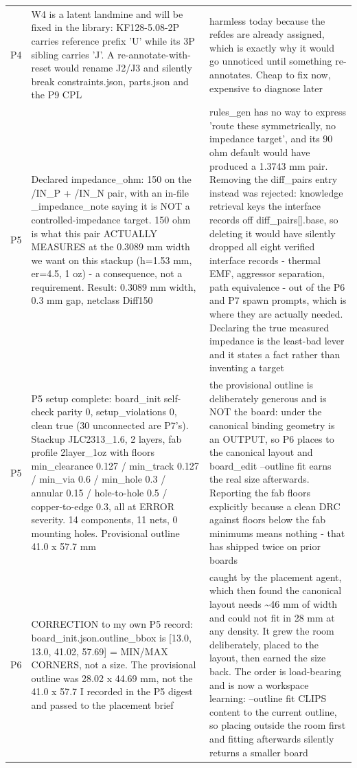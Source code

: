 \documentclass[11pt,a4paper]{article}
\begin{document}
{\begin{longtable}{lp{5.2cm}p{7.2cm}}
P4 & W4 is a latent landmine and will be fixed in the library: KF128-5.08-2P carries reference prefix 'U' while its 3P sibling carries 'J'. A re-annotate-with-reset would rename J2/J3 and silently break constraints.json, parts.json and the P9 CPL & harmless today because the refdes are already assigned, which is exactly why it would go unnoticed until something re-annotates. Cheap to fix now, expensive to diagnose later \\
P5 & Declared impedance\_ohm: 150 on the /IN\_P + /IN\_N pair, with an in-file \_impedance\_note saying it is NOT a controlled-impedance target. 150 ohm is what this pair ACTUALLY MEASURES at the 0.3089 mm width we want on this stackup (h=1.53 mm, er=4.5, 1 oz) - a consequence, not a requirement. Result: 0.3089 mm width, 0.3 mm gap, netclass Diff150 & rules\_gen has no way to express 'route these symmetrically, no impedance target', and its 90 ohm default would have produced a 1.3743 mm pair. Removing the diff\_pairs entry instead was rejected: knowledge retrieval keys the interface records off diff\_pairs{[}{]}.base, so deleting it would have silently dropped all eight verified interface records - thermal EMF, aggressor separation, path equivalence - out of the P6 and P7 spawn prompts, which is where they are actually needed. Declaring the true measured impedance is the least-bad lever and it states a fact rather than inventing a target \\
P5 & P5 setup complete: board\_init self-check parity 0, setup\_violations 0, clean true (30 unconnected are P7's). Stackup JLC2313\_1.6, 2 layers, fab profile 2layer\_1oz with floors min\_clearance 0.127 / min\_track 0.127 / min\_via 0.6 / min\_hole 0.3 / annular 0.15 / hole-to-hole 0.5 / copper-to-edge 0.3, all at ERROR severity. 14 components, 11 nets, 0 mounting holes. Provisional outline 41.0 x 57.7 mm & the provisional outline is deliberately generous and is NOT the board: under the canonical binding geometry is an OUTPUT, so P6 places to the canonical layout and board\_edit --outline fit earns the real size afterwards. Reporting the fab floors explicitly because a clean DRC against floors below the fab minimums means nothing - that has shipped twice on prior boards \\
P6 & CORRECTION to my own P5 record: board\_init.json.outline\_bbox is {[}13.0, 13.0, 41.02, 57.69{]} = MIN/MAX CORNERS, not a size. The provisional outline was 28.02 x 44.69 mm, not the 41.0 x 57.7 I recorded in the P5 digest and passed to the placement brief & caught by the placement agent, which then found the canonical layout needs \textasciitilde{}46 mm of width and could not fit in 28 mm at any density. It grew the room deliberately, placed to the layout, then earned the size back. The order is load-bearing and is now a workspace learning: --outline fit CLIPS content to the current outline, so placing outside the room first and fitting afterwards silently returns a smaller board \\

\end{longtable}}
\end{document}
